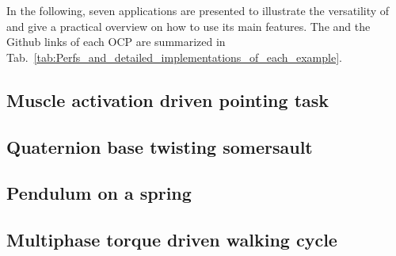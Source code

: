 In the following, seven applications are presented to illustrate the versatility of \bioptim and give a practical overview on how to use its main features.
The  and the Github links of each OCP are summarized in Tab.~\ref{tab:Perfs_and_detailed_implementations_of_each_example}.


\subsection{Muscle activation driven pointing task}


\subsection{Quaternion base twisting somersault}


\subsection{Pendulum on a spring}


\subsection{Multiphase torque driven walking cycle}


